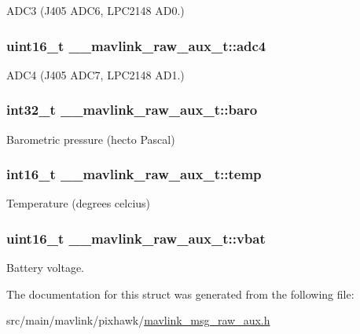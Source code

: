 A\+D\+C3 (J405 A\+D\+C6, L\+P\+C2148 A\+D0.) 

\hypertarget{struct____mavlink__raw__aux__t_aeb68737e2b5781df41e16ccd9d093eb6}{
\subsubsection[{adc4}]{\setlength{\rightskip}{0pt plus 5cm}uint16\+\_\+t \+\_\+\+\_\+mavlink\+\_\+raw\+\_\+aux\+\_\+t\+::adc4}}\label{struct____mavlink__raw__aux__t_aeb68737e2b5781df41e16ccd9d093eb6}


A\+D\+C4 (J405 A\+D\+C7, L\+P\+C2148 A\+D1.) 

\hypertarget{struct____mavlink__raw__aux__t_a5679ca5087f4ff5f9cc74757c1625328}{
\subsubsection[{baro}]{\setlength{\rightskip}{0pt plus 5cm}int32\+\_\+t \+\_\+\+\_\+mavlink\+\_\+raw\+\_\+aux\+\_\+t\+::baro}}\label{struct____mavlink__raw__aux__t_a5679ca5087f4ff5f9cc74757c1625328}


Barometric pressure (hecto Pascal) 

\hypertarget{struct____mavlink__raw__aux__t_a0182ad090cd222ca388661668bfd40d7}{
\subsubsection[{temp}]{\setlength{\rightskip}{0pt plus 5cm}int16\+\_\+t \+\_\+\+\_\+mavlink\+\_\+raw\+\_\+aux\+\_\+t\+::temp}}\label{struct____mavlink__raw__aux__t_a0182ad090cd222ca388661668bfd40d7}


Temperature (degrees celcius) 

\hypertarget{struct____mavlink__raw__aux__t_a249bd8bb4b618e00a28d88c4886d34a6}{
\subsubsection[{vbat}]{\setlength{\rightskip}{0pt plus 5cm}uint16\+\_\+t \+\_\+\+\_\+mavlink\+\_\+raw\+\_\+aux\+\_\+t\+::vbat}}\label{struct____mavlink__raw__aux__t_a249bd8bb4b618e00a28d88c4886d34a6}


Battery voltage. 



The documentation for this struct was generated from the following file\+:\begin{DoxyCompactItemize}
\item 
src/main/mavlink/pixhawk/\hyperlink{mavlink__msg__raw__aux_8h}{mavlink\+\_\+msg\+\_\+raw\+\_\+aux.\+h}\end{DoxyCompactItemize}
